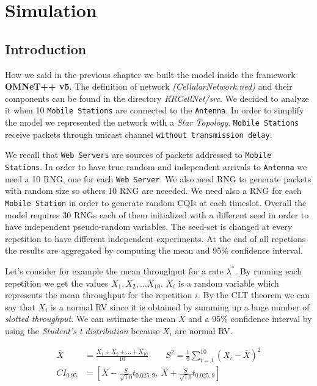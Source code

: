\chapter{Simulation}

\section{Introduction}
How we said in the previous chapter we built the model inside the framework \textbf{OMNeT++ v5}. The definition of network \textit{(CellularNetwork.ned)} and their components can be found in the directory \textit{RRCellNet/src}. We decided to analyze it when 10 \texttt{Mobile Stations} are connected to the \texttt{Antenna}. In order to simplify the model we represented the network with a \textit{Star Topology}. \texttt{Mobile Stations} receive packets through unicast channel \texttt{without transmission delay}.

We recall that \texttt{Web Servers} are sources of packets addressed to \texttt{Mobile Stations}. In order to have true random and independent arrivals to \texttt{Antenna} we need a 10 RNG, one for each \texttt{Web Server}. We also need RNG to generate packets with random size so others 10 RNG are neeeded. We need also a RNG for each \texttt{Mobile Station} in order to generate random CQIs at each timeslot. Overall the model requires 30 RNGs each of them initialized with a different seed in order to have independent pseudo-random variables. The seed-set is changed at every repetition to have different independent experiments. At the end of all repetions the results are aggregated by computing the mean and 95\% confidence interval. 

Let's consider for example the mean throughput for a rate \(\lambda^{*}\). By running each repetition we get the values \(X_{1},X_{2},\ldots X_{10}\). \(X_{i}\) is a random variable which represents the mean throughput for the repetition \(i\). By the CLT theorem we can say that \(X_{i}\) is a normal RV since it is obtained by summing up a huge number of \textit{slotted throughput}. We can estimate the mean \(\bar{X}\) and a 95\% confidence interval by using the \textit{Student's t distribution} because \(X_{i}\) are normal RV. 

\begin{align}
	\bar{X} &= \frac{X_{1}+X_{2}+\ldots+X_{10}}{10} \qquad S^{2} = \frac{1}{9}\sum_{i=1}^{10}(X_{i} - \bar{X})^{2} \\
	CI_{0.95} &= \left[\bar{X} - \frac{S}{\sqrt10}t_{0.025,9}, \: \bar{X} + \frac{S}{\sqrt10}t_{0.025,9}\right]
\end{align}

